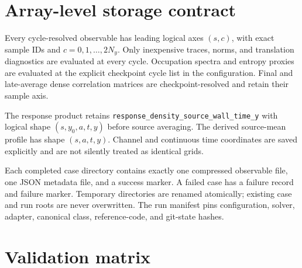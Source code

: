 \documentclass[aps,prb,onecolumn,nofootinbib]{revtex4-2}
\begin{document}
\section{Array-level storage contract}

Every cycle-resolved observable has leading logical axes $(s,c)$, with exact sample IDs
and $c=0,1,\ldots,2N_y$.  Only inexpensive traces, norms, and translation diagnostics
are evaluated at every cycle.  Occupation spectra and entropy proxies are evaluated at
the explicit checkpoint cycle list in the configuration.  Final and late-average dense
correlation matrices are checkpoint-resolved and retain their sample axis.

The response product retains
\texttt{response\_density\_source\_wall\_time\_y} with logical shape
$(s,y_0,a,t,y)$ before source averaging.  The derived source-mean profile has shape
$(s,a,t,y)$.  Channel and continuous time coordinates are saved explicitly and are not
silently treated as identical grids.

Each completed case directory contains exactly one compressed observable file, one JSON
metadata file, and a success marker.  A failed case has a failure record and failure
marker.  Temporary directories are renamed atomically; existing case and run roots are
never overwritten.  The run manifest pins configuration, solver, adapter, canonical
class, reference-code, and git-state hashes.

\section{Validation matrix}
\end{document}
